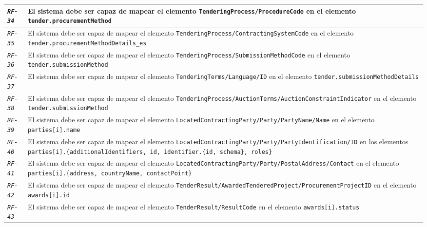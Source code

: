 \begin{longtable}{|| M{3cm} | M{12cm} ||}
                \hline
                    \texttt{\textit{RF-34}} & El sistema debe ser capaz de mapear el elemento \texttt{TenderingProcess/ProcedureCode} en el elemento \texttt{tender.procurementMethod} \\
                \hline
                    \texttt{\textit{RF-35}} & El sistema debe ser capaz de mapear el elemento \texttt{TenderingProcess/ContractingSystemCode} en el elemento \texttt{tender.procurementMethodDetails\_es} \\
                \hline
                    \texttt{\textit{RF-36}} & El sistema debe ser capaz de mapear el elemento \texttt{TenderingProcess/SubmissionMethodCode} en el elemento \texttt{tender.submissionMethod} \\
                \hline
                    \texttt{\textit{RF-37}} & El sistema debe ser capaz de mapear el elemento \texttt{TenderingTerms/Language/ID} en el elemento \texttt{tender.submissionMethodDetails} \\
                \hline
                    \texttt{\textit{RF-38}} & El sistema debe ser capaz de mapear el elemento \texttt{TenderingProcess/AuctionTerms/AuctionConstraintIndicator} en el elemento \texttt{tender.submissionMethod} \\
                \hline
                    \texttt{\textit{RF-39}} & El sistema debe ser capaz de mapear el elemento \texttt{LocatedContractingParty/Party/PartyName/Name} en el elemento \texttt{parties[i].name} \\
                \hline
                    \texttt{\textit{RF-40}} & El sistema debe ser capaz de mapear el elemento \texttt{LocatedContractingParty/Party/PartyIdentification/ID} en los elementos \texttt{parties[i].\{additionalIdentifiers, id, identifier.\{id, schema\}, roles\}} \\
                \hline
                    \texttt{\textit{RF-41}} & El sistema debe ser capaz de mapear el elemento \texttt{LocatedContractingParty/Party/PostalAddress/Contact} en el elemento \texttt{parties[i].\{address, countryName, contactPoint\}} \\
                \hline
                    \texttt{\textit{RF-42}} & El sistema debe ser capaz de mapear el elemento \texttt{TenderResult/AwardedTenderedProject/ProcurementProjectID} en el elemento \texttt{awards[i].id} \\
                \hline
                    \texttt{\textit{RF-43}} & El sistema debe ser capaz de mapear el elemento \texttt{TenderResult/ResultCode} en el elemento \texttt{awards[i].status} \\

\end{longtable}
